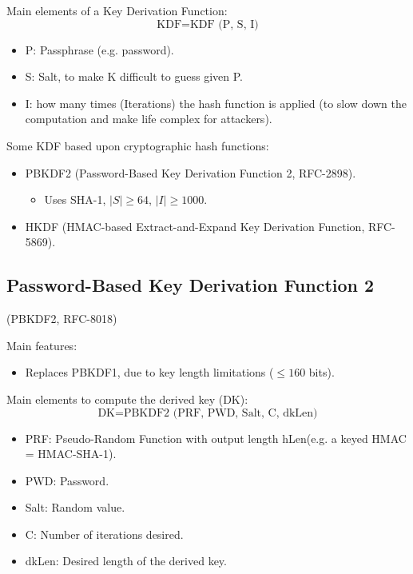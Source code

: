 Main elements of a Key Derivation Function:
\[
    \text{KDF} = \text{KDF (P, S, I)}
\]

\begin{itemize}
    \item P: Passphrase (e.g. password).
    \item S: Salt, to make K difficult to guess given P.
    \item I: how many times (Iterations) the hash function is applied (to slow down the computation and make life complex for attackers).
\end{itemize}

\vspace{0.2cm}

Some KDF based upon cryptographic hash functions:
\begin{itemize}
    \item PBKDF2 (Password-Based Key Derivation Function 2, RFC-2898).
    \begin{itemize}
        \item Uses SHA-1, $|S| \ge 64$, $|I| \ge 1000$.
    \end{itemize}
    \item HKDF (HMAC-based Extract-and-Expand Key Derivation Function, RFC-5869).
\end{itemize}

\subsection{Password-Based Key Derivation Function 2}
\begin{center}
    (PBKDF2, RFC-8018)
\end{center}

Main features:
\begin{itemize}
    \item Replaces PBKDF1, due to key length limitations ($\le 160$ bits).
\end{itemize}
Main elements to compute the derived key (DK):
\[
    \text{DK} = \text{PBKDF2 (PRF, PWD, Salt, C, dkLen)}
\]
\begin{itemize}
    \item PRF: Pseudo-Random Function with output length hLen(e.g. a keyed HMAC = HMAC-SHA-1).
    \item PWD: Password.
    \item Salt: Random value.
    \item C: Number of iterations desired.
    \item dkLen: Desired length of the derived key.
\end{itemize}

